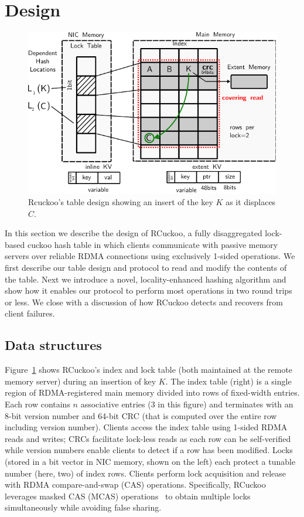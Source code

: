 \section{Design}
\label{sec:design}

\begin{figure}[t]
    \includegraphics[width=0.99\linewidth]{fig/table-diagram.pdf}
    \caption{Rcuckoo's table design showing an insert of the key $K$ as it displaces $C$.~}
    \label{fig:table-diagram}
\end{figure}

In this section we describe the design of RCuckoo, a fully
disaggregated lock-based cuckoo hash table in which clients
communicate with passive memory servers over reliable RDMA connections
using exclusively 1-sided operations.  We first describe our table
design and protocol to read and modify the contents of the table.
Next we introduce a novel, locality-enhanced hashing algorithm and show
how it enables our protocol to perform most operations in two round
trips or less.  We close with a discussion of how RCuckoo detects and
recovers from client failures.

\subsection{Data structures}
\label{sec:table-design}

Figure~\ref{fig:table-diagram} shows RCuckoo's index and lock table
(both maintained at the remote memory server) during an insertion of
key $K$.  The index table (right) is a single region of
RDMA-registered main memory divided into rows of fixed-width entries.
Each row contains $n$ associative entries (3 in this figure) and
terminates with an 8-bit version number and 64-bit CRC (that is
computed over the entire row including version number).  Clients
access the index table using 1-sided RDMA reads and writes; CRCs
facilitate lock-less reads as each row can be self-verified while
version numbers enable clients to detect if a row has been modified.
Locks (stored in a bit vector in NIC memory, shown on the left) each
protect a tunable number (here, two) of index rows.  Clients perform
lock acquisition and release with RDMA compare-and-swap (CAS)
operations.  Specifically, RCuckoo leverages masked CAS (MCAS)
operations~\cite{rdma-masked-cas,sherman} to obtain multiple locks
simultaneously while avoiding false sharing.

